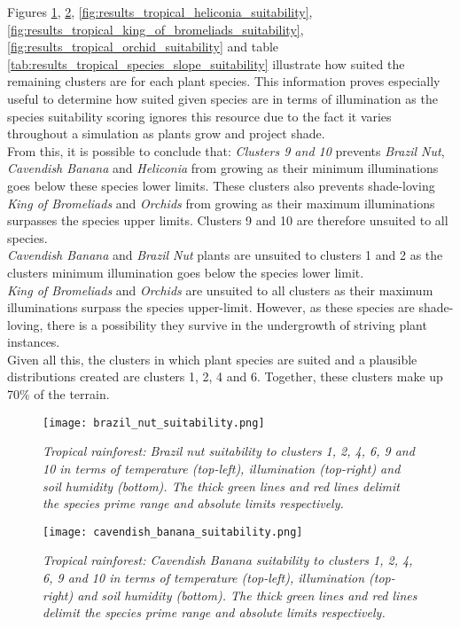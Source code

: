 Figures \ref{fig:results_tropical_brazil_nut_suitability}, \ref{fig:results_tropical_cavendish_banana_suitability}, \ref{fig:results_tropical_heliconia_suitability}, \ref{fig:results_tropical_king_of_bromeliads_suitability}, \ref{fig:results_tropical_orchid_suitability} and table \ref{tab:results_tropical_species_slope_suitability} illustrate how suited the remaining clusters are for each plant species. This information proves especially useful to determine how suited given species are in terms of illumination as the species suitability scoring ignores this resource due to the fact it varies throughout a simulation as plants grow and project shade.\\
From this, it is possible to conclude that: \textit{Clusters 9 and 10} prevents \textit{Brazil Nut}, \textit{Cavendish Banana} and \textit{Heliconia} from growing as their minimum illuminations goes below these species lower limits. These clusters also prevents shade-loving \textit{King of Bromeliads} and \textit{Orchids} from growing as their maximum illuminations surpasses the species upper limits. Clusters 9 and 10 are therefore unsuited to all species.\\
\textit{Cavendish Banana} and \textit{Brazil Nut} plants are unsuited to clusters 1 and 2 as the clusters minimum illumination goes below the species lower limit.\\
\textit{King of Bromeliads} and \textit{Orchids} are unsuited to all clusters as their maximum illuminations surpass the species upper-limit. However, as these species are shade-loving, there is a possibility they survive in the undergrowth of striving plant instances.\\
Given all this, the clusters in which plant species are suited and a plausible distributions created are clusters 1, 2, 4 and 6. Together, these clusters make up 70\% of the terrain.\\

\begin{figure}
\center
	\texttt{[image: brazil\_nut\_suitability.png]}
	\caption{ \textit{Tropical rainforest: Brazil nut suitability to clusters 1, 2, 4, 6, 9 and 10 in terms of temperature (top-left), illumination (top-right) and soil humidity (bottom). The thick green lines and red lines delimit the species prime range and absolute limits respectively.} }
	\label{fig:results_tropical_brazil_nut_suitability}
\end{figure}

\begin{figure}
\center
	\texttt{[image: cavendish\_banana\_suitability.png]}
	\caption{ \textit{Tropical rainforest: Cavendish Banana suitability to clusters 1, 2, 4, 6, 9 and 10 in terms of temperature (top-left), illumination (top-right) and soil humidity (bottom). The thick green lines and red lines delimit the species prime range and absolute limits respectively.}}
	\label{fig:results_tropical_cavendish_banana_suitability}
\end{figure}


